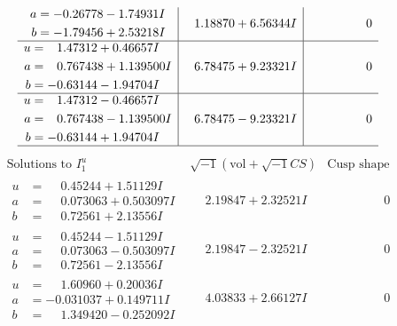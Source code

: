 \documentclass[1p]{elsarticle_modified}
\theoremstyle{definition}
\newcommand{\I}{\sqrt{-1}}
\begin{document}
$$\begin{array}{c|c|c}
\begin{aligned}
a &= -0.26778 - 1.74931 I \\
b &= -1.79456 + 2.53218 I\end{aligned}
 & \phantom{-}1.18870 + 6.56344 I & \phantom{-0.000000 } 0 \\ \hline\begin{aligned}
u &= \phantom{-}1.47312 + 0.46657 I \\
a &= \phantom{-}0.767438 + 1.139500 I \\
b &= -0.63144 - 1.94704 I\end{aligned}
 & \phantom{-}6.78475 + 9.23321 I & \phantom{-0.000000 } 0 \\ \hline\begin{aligned}
u &= \phantom{-}1.47312 - 0.46657 I \\
a &= \phantom{-}0.767438 - 1.139500 I \\
b &= -0.63144 + 1.94704 I\end{aligned}
 & \phantom{-}6.78475 - 9.23321 I & \phantom{-0.000000 } 0\\
 \hline 
 \end{array}$$\newpage$$\begin{array}{c|c|c}  
\text{Solutions to }I^u_{1}& \I (\text{vol} + \sqrt{-1}CS) & \text{Cusp shape}\\
 \hline 
\begin{aligned}
u &= \phantom{-}0.45244 + 1.51129 I \\
a &= \phantom{-}0.073063 + 0.503097 I \\
b &= \phantom{-}0.72561 + 2.13556 I\end{aligned}
 & \phantom{-}2.19847 + 2.32521 I & \phantom{-0.000000 } 0 \\ \hline\begin{aligned}
u &= \phantom{-}0.45244 - 1.51129 I \\
a &= \phantom{-}0.073063 - 0.503097 I \\
b &= \phantom{-}0.72561 - 2.13556 I\end{aligned}
 & \phantom{-}2.19847 - 2.32521 I & \phantom{-0.000000 } 0 \\ \hline\begin{aligned}
u &= \phantom{-}1.60960 + 0.20036 I \\
a &= -0.031037 + 0.149711 I \\
b &= \phantom{-}1.349420 - 0.252092 I\end{aligned}
 & \phantom{-}4.03833 + 2.66127 I & \phantom{-0.000000 } 0 \\ \hline\begin{aligned}

\end{aligned}
\end{array}$$
\end{document}
